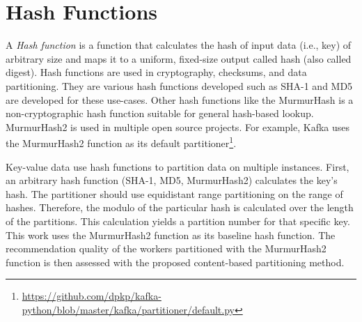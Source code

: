 \section{Hash Functions}
\label{sec:hash-functions}
A \emph{Hash function} is a function that calculates the hash of input data (i.e., key) of arbitrary size and maps it to a uniform, fixed-size output called hash (also called digest). Hash functions are used in cryptography, checksums, and data partitioning. They are various hash functions developed such as SHA-1 \cite{eastlakeUSSecureHash2001} and MD5 \cite{rivestMD5MessageDigestAlgorithm1992} are developed for these use-cases. Other hash functions like the MurmurHash is a non-cryptographic hash function suitable for general hash-based lookup. MurmurHash2 is used in multiple open source projects. For example, Kafka uses the MurmurHash2 function as its default partitioner\footnote{\url{https://github.com/dpkp/kafka-python/blob/master/kafka/partitioner/default.py}}.


Key-value data use hash functions to partition data on multiple instances. First, an arbitrary hash function (SHA-1, MD5, MurmurHash2) calculates the key's hash. The partitioner should use equidistant range partitioning on the range of hashes. Therefore, the modulo of the particular hash is calculated over the length of the partitions. This calculation yields a partition number for that specific key. This work uses the MurmurHash2 function as its baseline hash function. The recommendation quality of the workers partitioned with the MurmurHash2 function is then assessed with the proposed content-based partitioning method.